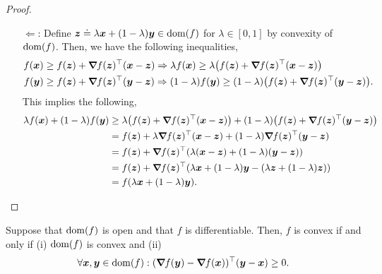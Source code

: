 \begin{proof}
\begin{enumerate}
        \item[$\Leftarrow$:] Define $\bm{z} \doteq \lambda \bm{x} + (1-\lambda) \bm{y} \in \mathrm{dom}(f)$ for $\lambda \in[0,1]$ by convexity of $\mathrm{dom}(f)$. Then, we have the following inequalities,
              \begin{align*}
                  f(\vec{x}) & \geq f(\vec{z}) + \transpose{\grad{f(\vec{z})}{}} (\vec{x}-\vec{z}) \Rightarrow \lambda f(\vec{x})     \geq \lambda \lft( f(\vec{z}) + \transpose{\grad{f(\vec{z})}{}} (\vec{x}-\vec{z}) \rgt)      \\
                  f(\vec{y}) & \geq f(\vec{z}) + \transpose{\grad{f(\vec{z})}{}} (\vec{y}-\vec{z}) \Rightarrow (1-\lambda) f(\vec{y}) \geq (1-\lambda) \lft( f(\vec{z}) + \transpose{\grad{f(\vec{z})}{}} (\vec{y}-\vec{z}) \rgt).
              \end{align*}
              This implies the following,
              \begin{align*}
                  \lambda f(\vec{x}) + (1-\lambda) f(\vec{y}) & \geq \lambda \lft( f(\vec{z}) + \transpose{\grad{f(\vec{z})}{}} (\vec{x}-\vec{z}) \rgt) + (1-\lambda) \lft( f(\vec{z}) + \transpose{\grad{f(\vec{z})}{}} (\vec{y}-\vec{z}) \rgt) \\
                                                              & = f(\vec{z}) + \lambda \transpose{\grad{f(\vec{z})}{}} (\vec{x}-\vec{z}) + (1-\lambda) \transpose{\grad{f(\vec{z})}{}} (\vec{y}-\vec{z})                                         \\
                                                              & = f(\vec{z}) + \transpose{\grad{f(\vec{z})}{}} \lft( \lambda (\vec{x}-\vec{z}) + (1-\lambda) (\vec{y}-\vec{z}) \rgt)                                                             \\
                                                              & = f(\vec{z}) + \transpose{\grad{f(\vec{z})}{}} \lft( \lambda \vec{x} + (1-\lambda) \vec{y} - (\lambda \vec{z} + (1-\lambda) \vec{z}) \rgt)                                       \\
                                                              & = f(\lambda \vec{x} + (1-\lambda) \vec{y}).
              \end{align*}
    \end{enumerate}
\end{proof}

\begin{lemma}
    \label{lem:first-order-convexity-alt}

    Suppose that $\mathrm{dom}(f)$ is open and that $f$ is differentiable. Then, $f$ is convex if and only if
    (i) $\mathrm{dom}(f)$ is convex and (ii) \[
        \forall \bm{x},\bm{y}\in\mathrm{dom}(f) : (\bm{\nabla}_{\! } f(\bm{y}) - \bm{\nabla}_{\! } f(\bm{x}))^\top (\bm{y} - \bm{x}) \geq 0.
    \]
\end{lemma}

